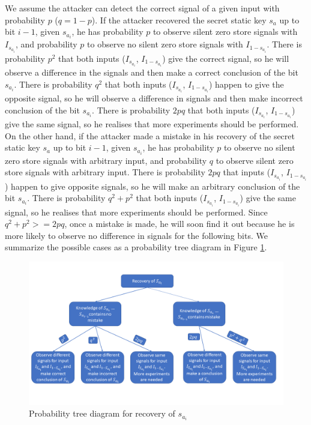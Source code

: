 \documentclass{iacrtrans}
\begin{document}
We assume the attacker can detect the correct signal of a given input with probability $p$ ($q=1-p$). If the attacker recovered the secret static key $s_a$ up to bit $i-1$, given $s_{a_i}$, he has probability $p$ to observe silent zero store signals with $I_{s_{a_i}}$, and probability $p$ to observe no silent zero store signals with $I_{1-s_{a_i}}$. There is probability $p^2$ that both inputs ($I_{s_{a_i}}$, $I_{1-s_{a_i}}$) give the correct signal, so he will observe a difference in the signals and then make a correct conclusion of the bit $s_{a_i}$. There is probability $q^2$ that both inputs ($I_{s_{a_i}}$, $I_{1-s_{a_i}}$) happen to give the opposite signal, so he will observe a difference in signals and then make incorrect conclusion of the bit $s_{a_i}$. There is probability $2pq$ that both inputs ($I_{s_{a_i}}$, $I_{1-s_{a_i}}$) give the same signal, so he realises that more experiments should be performed. On the other hand, if the attacker made a mistake in his recovery of the secret static key $s_a$ up to bit $i-1$, given $s_{a_i}$, he has probability $p$ to observe no silent zero store signals with arbitrary input, and probability $q$ to observe silent zero store signals with arbitrary input. There is probability $2pq$ that inputs ($I_{s_{a_i}}$, $I_{1-s_{a_i}}$) happen to give opposite signals, so he will make an arbitrary conclusion of the bit $s_{a_i}$. There is probability $q^2+p^2$ that both inputs ($I_{s_{a_i}}$, $I_{1-s_{a_i}}$) give the same signal, so he realises that more experiments should be performed. Since $q^2+p^2 >= 2pq$, once a mistake is made, he will soon find it out because he is more likely to observe no difference in signals for the following bits. We summarize the possible cases as a probability tree diagram in Figure \ref{fig:tree}.
\begin{figure}[h]
    \centering
    \includegraphics[scale=0.3]{error_route.png}
    \caption{Probability tree diagram for recovery of $s_{a_i}$}
    \label{fig:tree}
\end{figure}
\end{document}
